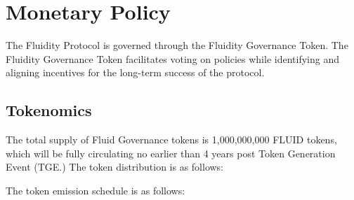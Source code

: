 
\section{Monetary Policy}
The Fluidity Protocol is governed through the Fluidity Governance Token. The Fluidity Governance Token facilitates voting on policies while identifying and aligning incentives for the long-term success of the protocol.

\subsection{Tokenomics}
The total supply of Fluid Governance tokens is 1,000,000,000 FLUID tokens, which will be fully circulating no earlier than 4 years post Token Generation Event (TGE.) The token distribution is as follows:

\vspace{1em}
 \begingroup
            \par
\endgroup
           \vspace{1em} 
           
The token emission schedule is as follows:
            
